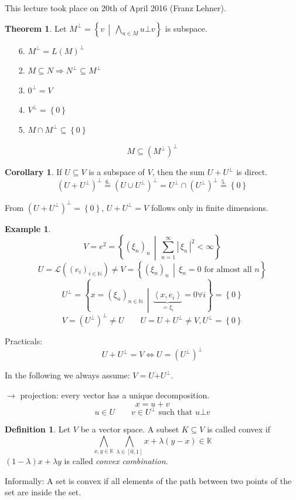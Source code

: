 \documentclass[a4paper,landscape,twocolumn]{article}
\newcommand\meta[3]{This #1 took place on #2 (#3).\par}
\newcommand\abs[1]{|\,#1\,|}
\newcommand\set[1]{\left\{#1\right\}}
\newcommand\setdef[2]{\left\{#1\,\middle|\,#2\right\}}
\newcommand\functional[1]{\left\langle{#1}\right\rangle}
\theoremstyle{definition}
\newtheorem{theorem}{Theorem}
\newtheorem{defi}{Definition}
\newtheorem{ex}{Example}
\newtheorem{cor}{Corollary}
\begin{document}
\meta{lecture}{20th of April 2016}{Franz Lehner}

\begin{theorem}
  Let $M^\bot = \setdef{v}{\bigwedge_{u \in M} u \bot v}$ is subspace.

  \begin{itemize}
    \item[6.] $M^\bot = L(M)^\bot$
    \item[2.] $M \subseteq N \Rightarrow N^\bot \subseteq M^\bot$
    \item[3.] $0^\bot = V$
    \item[4.] $V^\bot = \set{0}$
    \item[5.] $M \cap M^\bot \subseteq \set{0}$
  \end{itemize}
  \[ M \subseteq (M^\bot)^\bot \]
\end{theorem}

\begin{cor}
  \label{folderung-8.42}
  If $U \subseteq V$ is a subspace of $V$, then the sum $U + U^\bot$ is direct.
  \[ (U + U^\bot)^\bot \overset{\text{6.}}{=} (U \cup U^\bot)^\bot = U^\bot \cap (U^\bot)^\bot \overset{5.}{=} \set{0} \]
\end{cor}

From $(U + U^\bot)^\bot = \set{0}$, $U + U^\bot = V$ follows only in finite dimensions.

\begin{ex}
  \[ V = e^2 = \setdef{(\xi_n)_n}{\sum_{n=1}^\infty \abs{\xi_n}^2 < \infty} \]
  \[ U = \mathcal L((e_i)_{i \in \mathbb N}) \neq V = \setdef{(\xi_n)_n}{\xi_n = 0 \text{ for almost all } n} \]
  \[ U^\bot = \setdef{x = (\xi_n)_{n \in \mathbb N}}{\underbrace{\functional{x, e_i}}_{=\xi_i} = 0 \forall i} = \set{0} \]
  \[ V = (U^\bot)^\bot \neq U \qquad U = U + U^\bot \neq V, U^\bot = \set{0} \]
\end{ex}

Practicals:
\[ U + U^\bot = V \Leftrightarrow U = (U^\bot)^\bot \]

In the following we always assume: $V = U \dot{+} U^\bot$.

$\rightarrow$ projection: every vector has a unique decomposition.
\[ x = u + v \]
\[ u \in U \qquad v \in U^\bot \text{ such that } u \bot v \]

\begin{defi}
  \label{defi-8.44}
  Let $V$ be a vector space.
  A subset $K \subseteq V$ is called convex if
  \[ \bigwedge_{x,y \in \mathbb K} \bigwedge_{\lambda \in [0,1]} x + \lambda (y - x) \in \mathbb K \]
  $(1 - \lambda) x + \lambda y$ is called \emph{convex combination}.

  Informally: A set is convex if all elements of the path between two points of the set
  are inside the set.
\end{defi}
\end{document}
